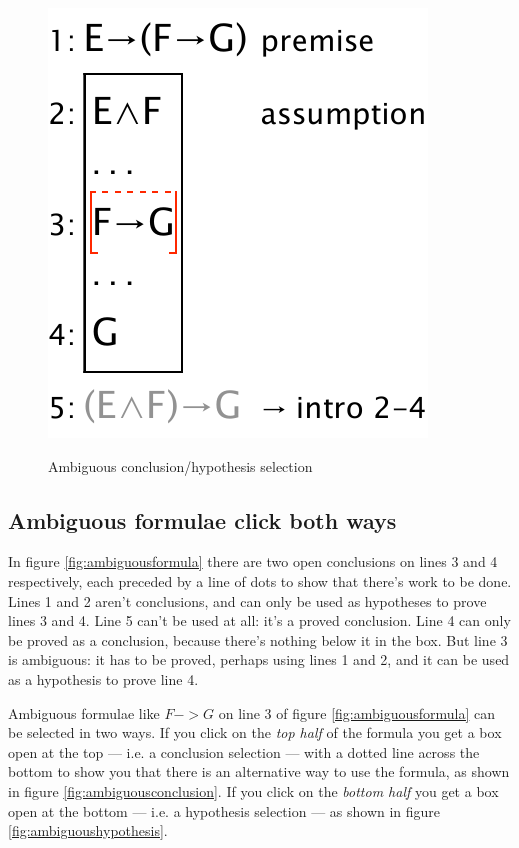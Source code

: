 \documentclass[11pt]{book}
\newcommand{\figref}[1]{figure \ref{fig:#1}}
\begin{document}
\begin{figure}
{  \includegraphics[scale=0.5]{pics/ambiguoushypothesis}}
\caption{Ambiguous conclusion/hypothesis selection}
\end{figure}

\subsection{Ambiguous formulae click both ways}

In \figref{ambiguousformula} there are two open conclusions on lines 3 and 4 respectively, each preceded by a line of dots to show that there's work to be done. Lines 1 and 2 aren't conclusions, and can only be used as hypotheses to prove lines 3 and 4. Line 5 can't be used at all: it's a proved conclusion. Line 4 can only be proved as a conclusion, because there's nothing below it in the box. But line 3 is ambiguous: it has to be proved, perhaps using lines 1 and 2, and it can be used as a hypothesis to prove line 4. 

Ambiguous formulae like $F->G$ on line 3 of \figref{ambiguousformula} can be selected in two ways. If you click on the \emph{top half} of the formula you get a box open at the top --- i.e. a conclusion selection --- with a dotted line across the bottom to show you that there is an alternative way to use the formula, as shown in \figref{ambiguousconclusion}. If you click on the \emph{bottom half} you get a box open at the bottom --- i.e. a hypothesis selection --- as shown in \figref{ambiguoushypothesis}.
\end{document}
